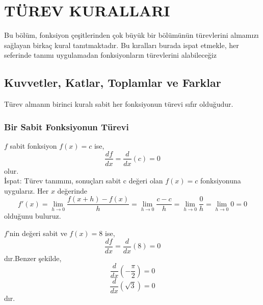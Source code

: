 \chapter{\protect TÜREV KURALLARI}
Bu bölüm, fonksiyon çeşitlerinden çok büyük bir bölümünün türevlerini almamızı sağlayan birkaç kural tanıtmaktadır. Bu kıralları burada ispat etmekle, her seferinde tanımı uygulamadan fonksiyonların türevlerini alabileceğiz
\section{\protect Kuvvetler, Katlar, Toplamlar ve Farklar} \label{bolumetiketi}
Türev almanın birinci kuralı sabit her fonksiyonun türevi sıfır olduğudur.
\subsection{\protect Bir Sabit Fonksiyonun Türevi}
$f$ sabit fonksiyon $f(x)=c$ ise,
	\begin{equation*}
		\frac{df}{dx}=\frac{d}{dx}(c)=0
\end{equation*}
olur.\\
İspat: Türev tanımını, sonuçları sabit c değeri olan $f(x)=c$ fonksiyonuna uygularız. Her $x$ değerinde
	\begin{equation*}
		f'(x)= \lim_{h \rightarrow 0} \frac{f(x+h)-f(x)}{h}=\lim_{h \rightarrow 0} \frac{c-c}{h}=\lim_{h \rightarrow 0} \frac{0}{h} = \lim_{h \rightarrow 0}0=0
	\end{equation*}
olduğunu buluruz.
\begin{ornek}
$f$'nin değeri sabit ve $f(x)=8$ ise,
	\begin{equation*}
		\frac{df}{dx}=\frac{d}{dx}(8)=0
	\end{equation*}
dır.Benzer şekilde,
	\begin{equation*}
		\frac{d}{dx}\left(-\frac{\pi}{2}\right)=0
	\end{equation*}
	\begin{equation*}
		\frac{d}{dx}\left(\sqrt{3}\right)=0
	\end{equation*}
dır.
\end{ornek}



